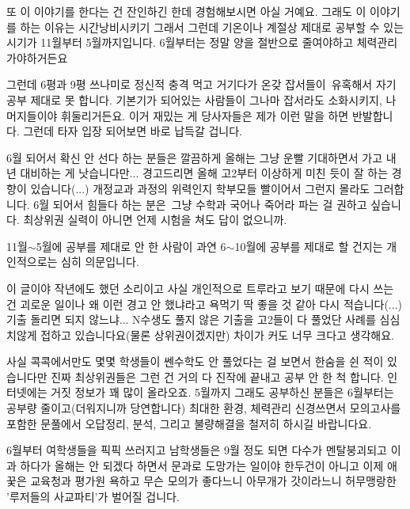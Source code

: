 \vspace{5mm}

또 이 이야기를 한다는 건 잔인하긴 한데 경험해보시면 아실 거예요.
그래도 이 이야기를 하는 이유는 시간낭비시키기 그래서 그런데
기온이나 계절상 제대로 공부할 수 있는 시기가 11월부터 5월까지입니다. 6월부터는 정말 양을 절반으로 줄여야하고 체력관리가야하거든요
\vspace{5mm}

그런데 6평과 9평 쓰나미로 정신적 충격 먹고 거기다가 온갖 잡서들이 유혹해서 자기 공부 제대로 못 합니다.
기본기가 되어있는 사람들이 그나마 잡서라도 소화시키지, 나머지들이야 휘둘리거든요.
이거 재밌는 게 당사자들은 제가 이런 말을 하면 반발합니다. 그런데 타자 입장 되어보면 바로 납득갈 겁니다.
\vspace{5mm}

6월 되어서 확신 안 선다 하는 분들은 깔끔하게 올해는 그냥 운빨 기대하면서 가고 내년 대비하는 게 낫습니다만...
경고드리면 올해 고2부터 이상하게 미친 듯이 잘 하는 경향이 있습니다(...) 개정교과 과정의 위력인지 학부모들 빨이어서 그런지 몰라도 그러합니다.
6월 되어서 힘들다 하는 분은 그냥 수학과 국어나 죽어라 파는 걸 권하고 싶습니다. 최상위권 실력이 아니면 언제 시험을 쳐도 답이 없으니까.
\vspace{5mm}

11월$\sim$5월에 공부를 제대로 안 한 사람이 과연 6$\sim$10월에 공부를 제대로 할 건지는 개인적으로는 심히 의문입니다.
\vspace{5mm}

이 글이야 작년에도 했던 소리이고 사실 개인적으로 트루라고 보기 때문에 다시 쓰는 건 괴로운 일이나
왜 이런 경고 안 했냐라고 욕먹기 딱 좋을 것 같아 다시 적습니다(...)
기출 돌리면 되지 않느냐... N수생도 풀지 않은 기출을 고2들이 다 풀었단 사례를 심심치않게 접하고 있습니다요(물론 상위권이겠지만)
차이가 커도 너무 크다고 생각해요.
\vspace{5mm}

사실 콕콕에서만도 몇몇 학생들이 쎈수학도 안 풀었다는 걸 보면서 한숨을 쉰 적이 있습니다만
진짜 최상위권들은 그런 건 거의 다 진작에 끝내고 공부 안 한 척 합니다. 인터넷에는 거짓 정보가 꽤 많이 올라오죠.
5월까지 그래도 공부하신 분들은 6월부터는 공부량 줄이고(더워지니까 당연합니다) 최대한 환경, 체력관리 신경쓰면서
모의고사를 포함한 문풀에서 오답정리, 분석, 그리고 불량해결을 철저히 하시길 바랍니다요.
\vspace{5mm}

6월부터 여학생들을 픽픽 쓰러지고 남학생들은 9월 정도 되면 다수가 멘탈붕괴되고
이과 하다가 올해는 안 되겠다 하면서 문과로 도망가는 일이야 한두건이 아니고
이제 애꿎은 교육청과 평가원 욕하고 무슨 모의가 좋다느니 아무개가 갓이라느니 허무맹랑한 '루저들의 사교파티'가 벌어질 겁니다.
\vspace{5mm}







